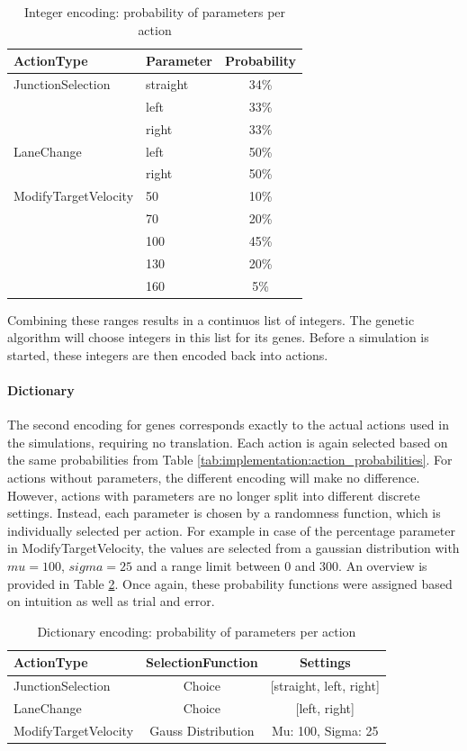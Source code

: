 \begin{table}[ht]
	\centering
	\begin{tabular}{llc}
		\hline
		ActionType & Parameter & Probability \\
		\hline
		JunctionSelection 	& straight & 34\% \\
		& left & 33\% \\
		& right & 33\% \\
		\hline
		LaneChange 			& left & 50\% \\
		& right & 50\% \\
		\hline
		ModifyTargetVelocity & 50 & 10\%\\
		& 70 & 20\%\\
		& 100 & 45\%\\
		& 130 & 20\%\\
		& 160 & 5\%\\
		\hline
	\end{tabular}
	\caption{Integer encoding: probability of parameters per action}
	\label{tab:implementation:integer_encoding_probabilities}
\end{table}

Combining these ranges results in a continuos list of integers. The genetic algorithm will choose integers in this list for its genes. Before a simulation is started, these integers are then encoded back into actions.

\paragraph{Dictionary}
The second encoding for genes corresponds exactly to the actual actions used in the simulations, requiring no translation. Each action is again selected based on the same probabilities from Table \ref{tab:implementation:action_probabilities}. For actions without parameters, the different encoding will make no difference. However, actions with parameters are no longer split into different discrete settings. Instead, each parameter is chosen by a randomness function, which is individually selected per action. For example in case of the percentage parameter in ModifyTargetVelocity, the values are selected from a gaussian distribution with $mu=100$, $sigma=25$ and a range limit between 0 and 300. An overview is provided in Table \ref{tab:implementation:dict_encoding_probabilities}.
Once again, these probability functions were assigned based on intuition as well as trial and error. 

\begin{table}[ht]
	\centering
	\begin{tabular}{lcc}
		\hline
		ActionType & SelectionFunction & Settings \\
		\hline
		JunctionSelection 	& Choice & [straight, left, right] \\
		LaneChange 			& Choice & [left, right]\\
		ModifyTargetVelocity & Gauss Distribution & Mu: 100, Sigma: 25\\
		\hline
	\end{tabular}
	\caption{Dictionary encoding: probability of parameters per action}
	\label{tab:implementation:dict_encoding_probabilities}
\end{table}

